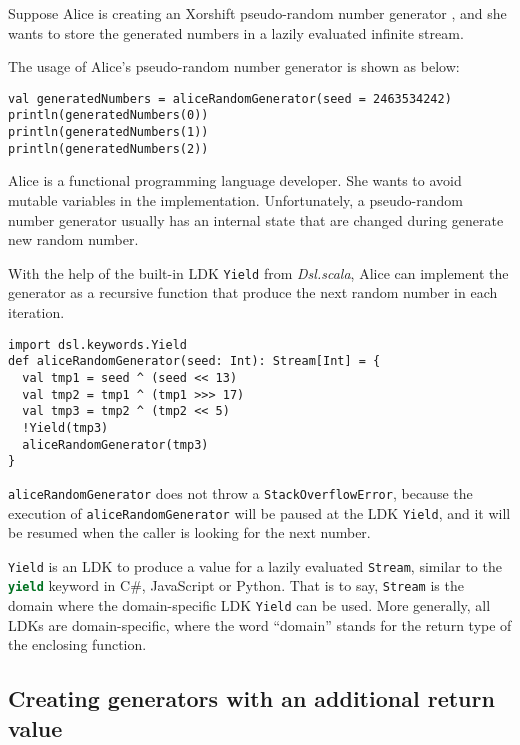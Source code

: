 Suppose Alice is creating an Xorshift pseudo-random number generator \cite{marsaglia2003xorshift}, and she wants to store the generated numbers in a lazily evaluated infinite stream. 

The usage of Alice's pseudo-random number generator is shown as below:

\begin{lstlisting}[caption={Using Alice's pseudo-random number generator},label={generatedNumbers}]
val generatedNumbers = aliceRandomGenerator(seed = 2463534242)
println(generatedNumbers(0))
println(generatedNumbers(1))
println(generatedNumbers(2))
\end{lstlisting}

Alice is a functional programming language developer. She wants to avoid mutable variables in the implementation. Unfortunately, a pseudo-random number generator usually has an internal state that are changed during generate new random number.

With the help of the built-in LDK \lstinline{Yield} from \textit{Dsl.scala}, Alice can implement the generator as a recursive function that produce the next random number in each iteration.

\begin{lstlisting}[caption={The implementation of Alice's pseudo-random number generator},label={aliceRandomGenerator}]
import dsl.keywords.Yield
def aliceRandomGenerator(seed: Int): Stream[Int] = {
  val tmp1 = seed ^ (seed << 13)
  val tmp2 = tmp1 ^ (tmp1 >>> 17)
  val tmp3 = tmp2 ^ (tmp2 << 5)
  !Yield(tmp3)
  aliceRandomGenerator(tmp3)
}
\end{lstlisting}

\lstinline{aliceRandomGenerator} does not throw a \lstinline{StackOverflowError}, because the execution of \lstinline{aliceRandomGenerator} will be paused at the LDK \lstinline{Yield}, and it will be resumed when the caller is looking for the next number.

\lstinline{Yield} is an LDK to produce a value for a lazily evaluated \lstinline{Stream}, similar to the \lstinline[language=Python]{yield} keyword in C\#, JavaScript or Python. That is to say, \lstinline{Stream} is the domain where the domain-specific LDK \lstinline{Yield} can be used. More generally, all LDKs are domain-specific, where the word ``domain'' stands for the return type of the enclosing function.

\subsection{Creating generators with an additional return value}

